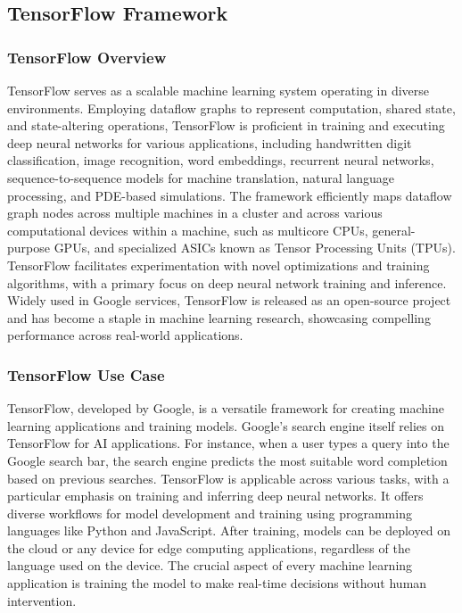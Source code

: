\subsection{TensorFlow Framework}

\subsubsection{TensorFlow Overview}

TensorFlow serves as a scalable machine learning system operating in diverse environments. Employing dataflow graphs to represent computation, shared state, and state-altering operations, TensorFlow is proficient in training and executing deep neural networks for various applications, including handwritten digit classification, image recognition, word embeddings, recurrent neural networks, sequence-to-sequence models for machine translation, natural language processing, and PDE-based simulations. The framework efficiently maps dataflow graph nodes across multiple machines in a cluster and across various computational devices within a machine, such as multicore CPUs, general-purpose GPUs, and specialized ASICs known as Tensor Processing Units (TPUs). TensorFlow facilitates experimentation with novel optimizations and training algorithms, with a primary focus on deep neural network training and inference. Widely used in Google services, TensorFlow is released as an open-source project and has become a staple in machine learning research, showcasing compelling performance across real-world applications.

\subsubsection{TensorFlow Use Case}

TensorFlow, developed by Google, is a versatile framework for creating machine learning applications and training models. Google's search engine itself relies on TensorFlow for AI applications. For instance, when a user types a query into the Google search bar, the search engine predicts the most suitable word completion based on previous searches. TensorFlow is applicable across various tasks, with a particular emphasis on training and inferring deep neural networks. It offers diverse workflows for model development and training using programming languages like Python and JavaScript. After training, models can be deployed on the cloud or any device for edge computing applications, regardless of the language used on the device. The crucial aspect of every machine learning application is training the model to make real-time decisions without human intervention.

